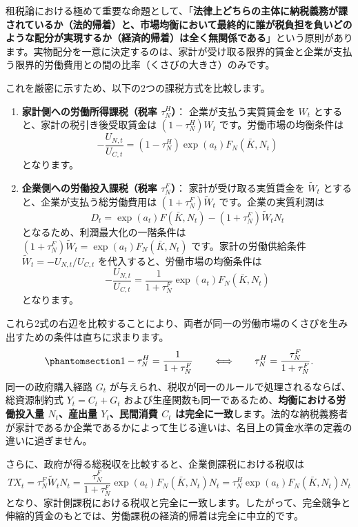 \documentclass[
  japanese,
  lualatex,
  ja=standard,
  12pt,
  a4paper]{ltjsarticle}
\providecommand{\tightlist}{%
  \setlength{\itemsep}{0pt}\setlength{\parskip}{0pt}}
\begin{document}
租税論における極めて重要な命題として、「\textbf{法律上どちらの主体に納税義務が課されているか（法的帰着）と、市場均衡において最終的に誰が税負担を負いどのような配分が実現するか（経済的帰着）は全く無関係である}」という原則があります。実物配分を一意に決定するのは、家計が受け取る限界的賃金と企業が支払う限界的労働費用との間の比率（くさびの大きさ）のみです。

これを厳密に示すため、以下の2つの課税方式を比較します。

\begin{enumerate}
\def\labelenumi{\arabic{enumi}.}
\tightlist
\item
  \textbf{家計側への労働所得課税（税率 \(\tau_N^H\)）}：
  企業が支払う実質賃金を \(W_t\) とすると、家計の税引き後受取賃金は
  \((1-\tau_N^H)W_t\) です。労働市場の均衡条件は \[
  -\frac{U_{N,t}}{U_{C,t}} = (1-\tau_N^H) \exp(a_t) F_N(\bar{K}, N_t)
  \] となります。
\item
  \textbf{企業側への労働投入課税（税率 \(\tau_N^F\)）}：
  家計が受け取る実質賃金を \(\widetilde{W}_t\)
  とすると、企業が支払う総労働費用は \((1+\tau_N^F)\widetilde{W}_t\)
  です。企業の実質利潤は \[
  D_t = \exp(a_t) F(\bar{K}, N_t) - (1+\tau_N^F) \widetilde{W}_t N_t
  \] となるため、利潤最大化の一階条件は
  \((1+\tau_N^F)\widetilde{W}_t = \exp(a_t) F_N(\bar{K}, N_t)\)
  です。家計の労働供給条件 \(\widetilde{W}_t = -U_{N,t}/U_{C,t}\)
  を代入すると、労働市場の均衡条件は \[
  -\frac{U_{N,t}}{U_{C,t}} = \frac{1}{1+\tau_N^F} \exp(a_t) F_N(\bar{K}, N_t)
  \] となります。
\end{enumerate}

これら2式の右辺を比較することにより、両者が同一の労働市場のくさびを生み出すための条件は直ちに求まります。
\begin{equation}\protect\phantomsection\label{eq-tax-incidence-equivalence}{
1 - \tau_N^H = \frac{1}{1+\tau_N^F} \qquad \Longleftrightarrow \qquad \tau_N^H = \frac{\tau_N^F}{1+\tau_N^F}.
}\end{equation} 同一の政府購入経路 \(G_t\)
が与えられ、税収が同一のルールで処理されるならば、総資源制約式
\(Y_t = C_t + G_t\)
および生産関数も同一であるため、\textbf{均衡における労働投入量
\(N_t\)、産出量 \(Y_t\)、民間消費 \(C_t\)
は完全に一致}します。法的な納税義務者が家計であるか企業であるかによって生じる違いは、名目上の賃金水準の定義の違いに過ぎません。

さらに、政府が得る総税収を比較すると、企業側課税における税収は \[
TX_t = \tau_N^F \widetilde{W}_t N_t = \frac{\tau_N^F}{1+\tau_N^F} \exp(a_t) F_N(\bar{K}, N_t) N_t = \tau_N^H \exp(a_t) F_N(\bar{K}, N_t) N_t
\]
となり、家計側課税における税収と完全に一致します。したがって、完全競争と伸縮的賃金のもとでは、労働課税の経済的帰着は完全に中立的です。
\end{document}
